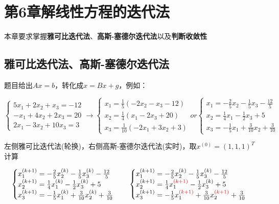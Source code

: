 \section{第6章解线性方程的迭代法}

本章要求掌握\textbf{雅可比迭代法}、\textbf{高斯-塞德尔迭代法}以及\textbf{判断收敛性}

\subsection{雅可比迭代法、高斯-塞德尔迭代法}

题目给出$Ax=b$，转化成$x=Bx+g$，例如：

\[
\begin{cases}
5x_1 + 2x_2 + x_3 = -12 \\
-x_1 + 4x_2 + 2x_3 = 20 \\
2x_1 - 3x_2 + 10x_3 = 3
\end{cases}
\xrightarrow{}
\begin{cases}
x_1 = \frac{1}{5} \left(-2x_2 - x_3  -12\right) \\
x_2 = \frac{1}{4} \left(x_1 - 2x_3  +20\right) \\
x_3 = \frac{1}{10} \left(-2x_1 + 3x_2  +3\right)
\end{cases}
or
\begin{cases}
x_1 = -\frac{2}{5}x_2 - \frac{1}{5}x_3  -\frac{12}{5} \\
x_2 = \frac{1}{4}x_1 - \frac{1}{2}x_3  + 5 \\
x_3 = -\frac{1}{5}x_1 + \frac{3}{10}x_2  +\frac{3}{10}
\end{cases}
\]

左侧雅可比迭代法(轮换)，右侧高斯-塞德尔迭代法(实时)，取$x^{(0)}=(1,1,1)^T$计算

\[
\begin{cases}
x_1^{(k+1)} = -\frac{2}{5}x_2^{(k)} - \frac{1}{5}x_3^{(k)}  -\frac{12}{5} \\
x_2^{(k+1)} = \frac{1}{4}x_1^{(k)} - \frac{1}{2}x_3^{(k)}  + 5 \\
x_3^{(k+1)} = -\frac{1}{5}x_1^{(k)} + \frac{3}{10}x_2^{(k)}  +\frac{3}{10}
\end{cases}
\quad
\begin{cases}
x_1^{(k+1)} = -\frac{2}{5}x_2^{(k)} - \frac{1}{5}x_3^{(k)}  -\frac{12}{5} \\
x_2^{(k+1)} = \frac{1}{4}x_1^{\textcolor{red}{(k+1)}} - \frac{1}{2}x_3^{(k)}  + 5 \\
x_3^{(k+1)} = -\frac{1}{5}x_1^{\textcolor{red}{(k+1)}} + \frac{3}{10}x_2^{\textcolor{red}{(k+1)}}  +\frac{3}{10}
\end{cases}
\]

